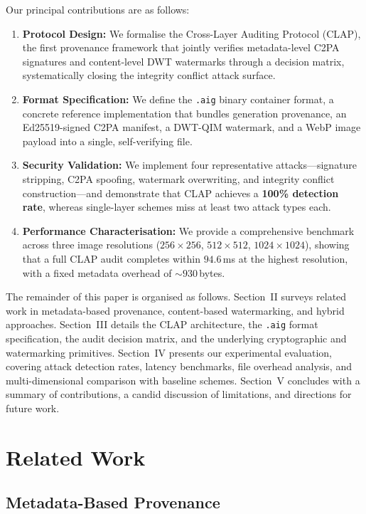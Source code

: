 \documentclass[conference]{IEEEtran}
\begin{document}
Our principal contributions are as follows:
\begin{enumerate}
    \item \textbf{Protocol Design:} We formalise the Cross-Layer Auditing
    Protocol (CLAP), the first provenance framework that jointly verifies
    metadata-level C2PA signatures and content-level DWT watermarks
    through a decision matrix, systematically closing the integrity
    conflict attack surface.
    \item \textbf{Format Specification:} We define the \texttt{.aig}
    binary container format, a concrete reference implementation that
    bundles generation provenance, an Ed25519-signed C2PA manifest, a
    DWT-QIM watermark, and a WebP image payload into a single,
    self-verifying file.
    \item \textbf{Security Validation:} We implement four representative
    attacks—signature stripping, C2PA spoofing, watermark overwriting, and
    integrity conflict construction—and demonstrate that CLAP achieves a
    \textbf{100\% detection rate}, whereas single-layer schemes miss at
    least two attack types each.
    \item \textbf{Performance Characterisation:} We provide a comprehensive
    benchmark across three image resolutions ($256{\times}256$,
    $512{\times}512$, $1024{\times}1024$), showing that a full CLAP audit
    completes within $94.6$\,ms at the highest resolution, with a fixed
    metadata overhead of ${\sim}930$\,bytes.
\end{enumerate}

The remainder of this paper is organised as follows.
Section~II surveys related work in metadata-based provenance,
content-based watermarking, and hybrid approaches.
Section~III details the CLAP architecture, the \texttt{.aig} format
specification, the audit decision matrix, and the underlying
cryptographic and watermarking primitives.
Section~IV presents our experimental evaluation, covering attack
detection rates, latency benchmarks, file overhead analysis, and
multi-dimensional comparison with baseline schemes.
Section~V concludes with a summary of contributions, a candid discussion
of limitations, and directions for future work.

\section{Related Work}

\subsection{Metadata-Based Provenance}
\end{document}

